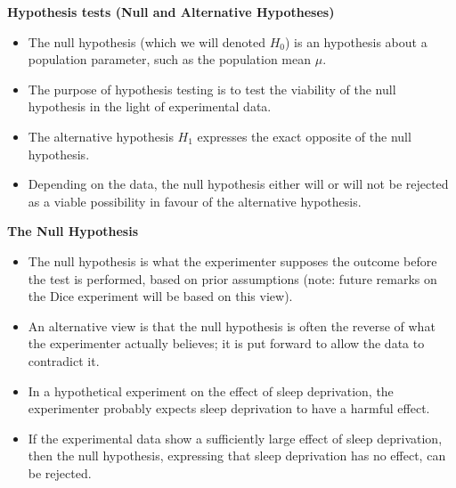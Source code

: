 
\noindent \textbf{Hypothesis tests (Null and Alternative Hypotheses) }
\large
\begin{itemize}
\item The null hypothesis (which we will denoted $H_0$) is an hypothesis about a population parameter, such as the population mean $\mu$. \item The purpose of hypothesis testing is to test the viability of the null hypothesis in the light of experimental data. \item The alternative hypothesis $H_1$ expresses the exact opposite of the null hypothesis. \item Depending on the data, the null hypothesis either will or will not be rejected as a viable possibility in favour of the alternative hypothesis.
\end{itemize}






\noindent \textbf{The Null Hypothesis }
\large
\begin{itemize}
\item The null hypothesis is what the experimenter supposes the outcome before the test is performed, based on prior assumptions (note:  future remarks on the Dice experiment will be based on this view).
\item An alternative view is that the null hypothesis is often the reverse of what the experimenter actually believes; it is put forward to allow the data to contradict it. \item In a hypothetical experiment on the effect of sleep deprivation, the experimenter probably expects sleep deprivation to have a harmful effect. \item If the experimental data show a sufficiently large effect of sleep deprivation, then the null hypothesis, expressing that sleep deprivation has no effect, can be rejected.
\end{itemize}



